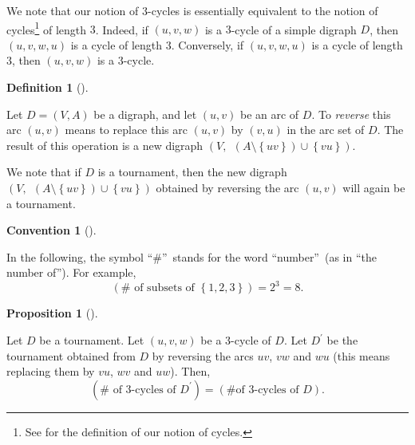 \documentclass[numbers=enddot,12pt,final,onecolumn,notitlepage]{scrartcl}%
\numberwithin{exer}{subsection}
\theoremstyle{definition}
\newtheorem{prop}[theo]{Proposition}
\newenvironment{proposition}[1][]
{\begin{prop}[#1]\begin{leftbar}}
{\end{leftbar}\end{prop}}
\newtheorem{defi}[theo]{Definition}
\newenvironment{definition}[1][]
{\begin{defi}[#1]\begin{leftbar}}
{\end{leftbar}\end{defi}}
\newtheorem{conv}[theo]{Convention}
\newenvironment{convention}[1][]
{\begin{conv}[#1]\begin{leftbar}}
{\end{leftbar}\end{conv}}
\begin{document}
We note that our notion of $3$-cycles is essentially equivalent to the notion
of cycles\footnote{See \cite[Definition 1.5.1 \textbf{(b)}]{lec7} for the
definition of our notion of cycles.} of length $3$. Indeed, if $\left(
u,v,w\right)  $ is a $3$-cycle of a simple digraph $D$, then $\left(
u,v,w,u\right)  $ is a cycle of length $3$. Conversely, if $\left(
u,v,w,u\right)  $ is a cycle of length $3$, then $\left(  u,v,w\right)  $ is a
$3$-cycle.

\begin{definition}
Let $D=\left(  V,A\right)  $ be a digraph, and let $\left(  u,v\right)  $ be
an arc of $D$. To \emph{reverse} this arc $\left(  u,v\right)  $ means to
replace this arc $\left(  u,v\right)  $ by $\left(  v,u\right)  $ in the arc
set of $D$. The result of this operation is a new digraph $\left(
V,\ \ \left(  A\setminus\left\{  uv\right\}  \right)  \cup\left\{  vu\right\}
\right)  $.
\end{definition}

We note that if $D$ is a tournament, then the new digraph $\left(
V,\ \ \left(  A\setminus\left\{  uv\right\}  \right)  \cup\left\{  vu\right\}
\right)  $ obtained by reversing the arc $\left(  u,v\right)  $ will again be
a tournament.

\begin{convention}
In the following, the symbol \textquotedblleft$\#$\textquotedblright\ stands
for the word \textquotedblleft number\textquotedblright\ (as in
\textquotedblleft the number of\textquotedblright). For example,
\[
\left(  \#\text{ of subsets of }\left\{  1,2,3\right\}  \right)  =2^{3}=8.
\]

\end{convention}

\begin{proposition}
\label{prop.tour-vand.1}Let $D$ be a tournament. Let $\left(  u,v,w\right)  $
be a $3$-cycle of $D$. Let $D^{\prime}$ be the tournament obtained from $D$ by
reversing the arcs $uv$, $vw$ and $wu$ (this means replacing them by $vu$,
$wv$ and $uw$). Then,%
\[
\left(  \#\text{ of }3\text{-cycles of }D^{\prime}\right)  =\left(  \#\text{
of }3\text{-cycles of }D\right)  .
\]

\end{proposition}
\end{document}
